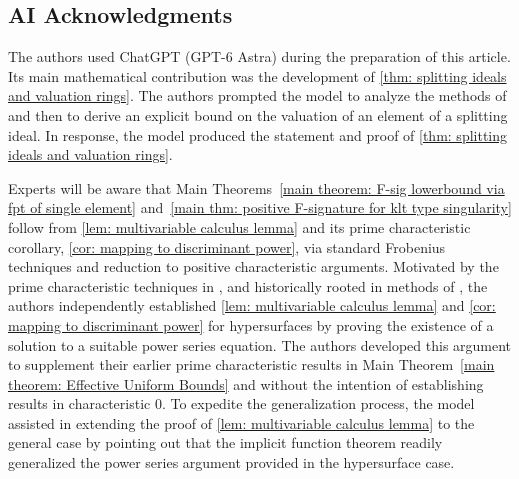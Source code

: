 \documentclass[12pt]{amsart}
\numberwithin{equation}{theorem}
\theoremstyle{plain}
\newcommand{\fm}{\mathfrak{m}}
\newcommand{\NN}{\mathbb{N}}
\begin{document}

\subsection*{AI Acknowledgments} The authors used ChatGPT (GPT-6 Astra) during the preparation of this article. Its main mathematical contribution was the development of \cref{thm: splitting ideals and valuation rings}. The authors prompted the model to analyze the methods of \cite[Lemma~13.19]{MaPolstra} and then to derive an explicit bound on the valuation of an element of a splitting ideal. In response, the model produced the statement and proof of \cref{thm: splitting ideals and valuation rings}.

Experts will be aware that Main Theorems~\ref{main theorem: F-sig lowerbound via fpt of single element} and~\ref{main thm: positive F-signature for klt type singularity} follow from \cref{lem: multivariable calculus lemma} and its prime characteristic corollary, \cref{cor: mapping to discriminant power}, via standard Frobenius techniques and reduction to positive characteristic arguments. Motivated by the prime characteristic techniques in \cite{PolstraSmirnov2020,DeStefaniSmirnov2024}, and historically rooted in methods of \cite{Samuel1951Singularites}, the authors independently established \cref{lem: multivariable calculus lemma} and \cref{cor: mapping to discriminant power} for hypersurfaces by proving the existence of a solution to a suitable power series equation. The authors developed this argument to supplement their earlier prime characteristic results in Main Theorem~\ref{main theorem: Effective Uniform Bounds} and without the intention of establishing results in characteristic $0$. To expedite the generalization process, the model assisted in extending the proof of \cref{lem: multivariable calculus lemma} to the general case by pointing out that the implicit function theorem readily generalized the power series argument provided in the hypersurface case.
\end{document}
